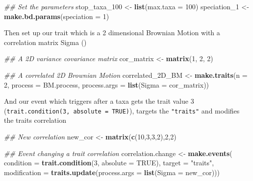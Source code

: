 \documentclass[
]{book}
\newenvironment{Shaded}{\begin{snugshade}}{\end{snugshade}}
\newcommand{\CommentTok}[1]{\textcolor[rgb]{0.56,0.35,0.01}{\textit{#1}}}
\newcommand{\DataTypeTok}[1]{\textcolor[rgb]{0.13,0.29,0.53}{#1}}
\newcommand{\DecValTok}[1]{\textcolor[rgb]{0.00,0.00,0.81}{#1}}
\newcommand{\KeywordTok}[1]{\textcolor[rgb]{0.13,0.29,0.53}{\textbf{#1}}}
\newcommand{\NormalTok}[1]{#1}
\newcommand{\OtherTok}[1]{\textcolor[rgb]{0.56,0.35,0.01}{#1}}
\newcommand{\StringTok}[1]{\textcolor[rgb]{0.31,0.60,0.02}{#1}}
\begin{document}
\begin{Shaded}
\begin{Highlighting}[]
\CommentTok{\#\# Set the parameters}
\NormalTok{stop\_taxa\_}\DecValTok{100}\NormalTok{ \textless{}{-}}\StringTok{ }\KeywordTok{list}\NormalTok{(}\DataTypeTok{max.taxa =} \DecValTok{100}\NormalTok{)}
\NormalTok{speciation\_}\DecValTok{1}\NormalTok{ \textless{}{-}}\StringTok{ }\KeywordTok{make.bd.params}\NormalTok{(}\DataTypeTok{speciation =} \DecValTok{1}\NormalTok{)}
\end{Highlighting}
\end{Shaded}

Then set up our trait which is a 2 dimensional Brownian Motion with a correlation matrix Sigma ()

\begin{Shaded}
\begin{Highlighting}[]
\CommentTok{\#\# A 2D variance covariance matrix}
\NormalTok{cor\_matrix \textless{}{-}}\StringTok{ }\KeywordTok{matrix}\NormalTok{(}\DecValTok{1}\NormalTok{, }\DecValTok{2}\NormalTok{, }\DecValTok{2}\NormalTok{)}

\CommentTok{\#\# A correlated 2D Brownian Motion}
\NormalTok{correlated\_2D\_BM \textless{}{-}}\StringTok{ }\KeywordTok{make.traits}\NormalTok{(}\DataTypeTok{n =} \DecValTok{2}\NormalTok{, }\DataTypeTok{process =}\NormalTok{ BM.process,}
                      \DataTypeTok{process.args =} \KeywordTok{list}\NormalTok{(}\DataTypeTok{Sigma =}\NormalTok{ cor\_matrix))}
\end{Highlighting}
\end{Shaded}

And our event which triggers after a taxa gets the trait value 3 (\texttt{trait.condition(3,\ absolute\ =\ TRUE)}), targets the \texttt{"traits"} and modifies the traits correlation

\begin{Shaded}
\begin{Highlighting}[]
\CommentTok{\#\# New correlation}
\NormalTok{new\_cor \textless{}{-}}\StringTok{ }\KeywordTok{matrix}\NormalTok{(}\KeywordTok{c}\NormalTok{(}\DecValTok{10}\NormalTok{,}\DecValTok{3}\NormalTok{,}\DecValTok{3}\NormalTok{,}\DecValTok{2}\NormalTok{),}\DecValTok{2}\NormalTok{,}\DecValTok{2}\NormalTok{)}

\CommentTok{\#\# Event changing a trait correlation}
\NormalTok{correlation.change \textless{}{-}}\StringTok{ }\KeywordTok{make.events}\NormalTok{(}
    \DataTypeTok{condition    =} \KeywordTok{trait.condition}\NormalTok{(}\DecValTok{3}\NormalTok{, }\DataTypeTok{absolute =} \OtherTok{TRUE}\NormalTok{),}
    \DataTypeTok{target       =} \StringTok{"traits"}\NormalTok{,}
    \DataTypeTok{modification =} \KeywordTok{traits.update}\NormalTok{(}\DataTypeTok{process.args =} \KeywordTok{list}\NormalTok{(}\DataTypeTok{Sigma =}\NormalTok{ new\_cor)))}
\end{Highlighting}
\end{Shaded}
\end{document}
